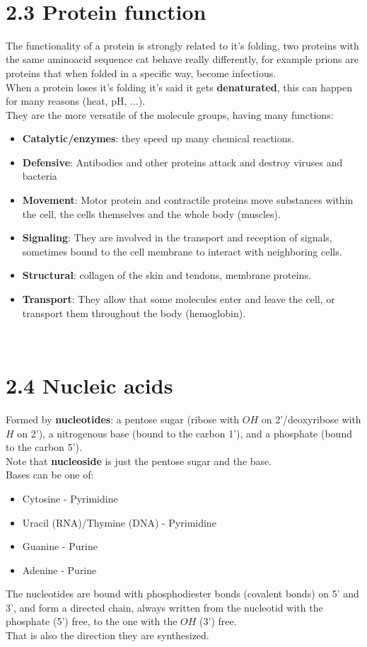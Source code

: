 \documentclass[a4paper,landscape,10pt]{cheatsheet}
\begin{document}
\hfill\\
\section*{2.3 Protein function}
The functionality of a protein is strongly related to it's folding, two proteins with the same aminoacid sequence cat
behave really differently, for example prions are proteins that when folded in a specific way, become infectious.\\
When a protein loses it's folding it's said it gets \textbf{denaturated}, this can happen for many reasons (heat, pH,
...).\\
They are the more versatile of the molecule groups, having many functions:\
\begin{itemize}
  \item \textbf{Catalytic/enzymes}: they speed up many chemical reactions.
  \item \textbf{Defensive}: Antibodies and other proteins attack and destroy viruses and bacteria
  \item \textbf{Movement}: Motor protein and contractile proteins move substances within the cell, the cells themselves
        and the whole body (muscles).
  \item \textbf{Signaling}: They are involved in the transport and reception of signals, sometimes bound to the cell
        membrane to interact with neighboring cells.
  \item \textbf{Structural}: collagen of the skin and tendons, membrane proteins.
  \item \textbf{Transport}: They allow that some molecules enter and leave the cell, or transport them throughout the
        body (hemoglobin).
\end{itemize}

\hfill\\
\section*{2.4 Nucleic acids}
Formed by \textbf{nucleotides}: a pentose sugar (ribose with $OH$ on 2'/deoxyribose with $H$ on 2'), a nitrogenous base
(bound to the carbon 1'), and a phosphate (bound to the carbon 5').\\
Note that \textbf{nucleoside} is just the pentose sugar and the base.\\
Bases can be one of:
\begin{itemize}
  \item Cytosine - Pyrimidine
  \item Uracil (RNA)/Thymine (DNA) - Pyrimidine
  \item Guanine - Purine
  \item Adenine - Purine
\end{itemize}
The nucleotides are bound with phosphodiester bonds (covalent bonds) on 5' and 3', and form a directed chain, always
written from the nucleotid with the phosphate (5') free, to the one with the $OH$ (3') free.\\
That is also the direction they are synthesized.\\
\end{document}
